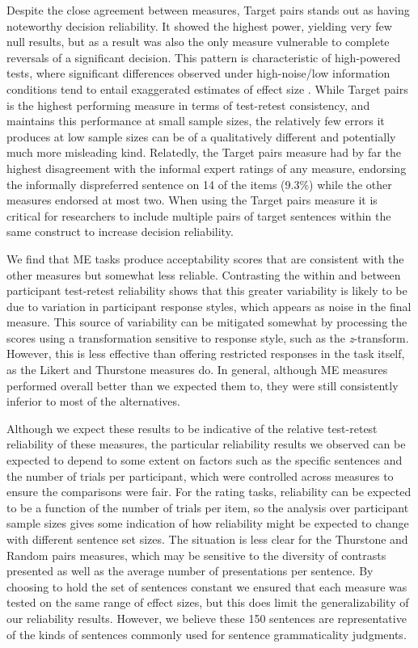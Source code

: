 \documentclass[doc]{apa6}
\newcommand{\targchoice}{{\sc Target pairs}}
\newcommand{\rndchoice}{{\sc Random pairs}}
\newcommand{\ME}{{\sc ME}}%
\newcommand{\thurstone}{{\sc Thurstone}}
\newcommand{\likert}{{\sc Likert}}
\newcommand{\ratingtask}{rating task}
\begin{document}
Despite the close agreement between measures, \targchoice{} stands out as having noteworthy decision reliability. It showed the highest power, yielding very few null results, but as a result was also the only measure vulnerable to complete reversals of a significant decision. This pattern is characteristic of high-powered tests, where significant differences observed under high-noise/low information conditions tend to entail exaggerated estimates of effect size \citep{gelman2017doesntkillmakesstrongerfallacy}. While \targchoice{} is the highest performing measure in terms of test-retest consistency, and maintains this performance at small sample sizes, the relatively few errors it produces at low sample sizes can be of a qualitatively different and potentially much more misleading kind. Relatedly, the \targchoice{} measure had by far the highest disagreement with the informal expert ratings of any measure, endorsing the informally dispreferred sentence on 14 of the items (9.3\%) while the other measures endorsed at most two.
When using the \targchoice{} measure it is critical for researchers to include multiple pairs of target sentences within the same construct to increase decision reliability.

We find that \ME{} tasks produce acceptability scores that are consistent with the other measures but somewhat less reliable. Contrasting the within and between participant test-retest reliability shows that this greater variability is likely to be due to variation in participant response styles, which appears as noise in the final measure. This source of variability can be mitigated somewhat by processing the scores using a transformation sensitive to response style, such as the {\it z}-transform. However, this is less effective than offering restricted responses in the task itself, as the \likert{} and \thurstone{} measures do. In general, although \ME{} measures performed overall better than we expected them to, they were still consistently inferior to most of the alternatives.

Although we expect these results to be indicative of the relative test-retest reliability of these measures, the particular reliability results we observed can be expected to depend to some extent on factors such as the specific sentences and the number of trials per participant, which were controlled across measures to ensure the comparisons were fair. For the {\ratingtask}s, reliability can be expected to be a function of the number of trials per item, so the analysis over participant sample sizes gives some indication of how reliability might be expected to change with different sentence set sizes. The situation is less clear for the \thurstone{} and \rndchoice{} measures, which may be sensitive to the diversity of contrasts presented as well as the average number of presentations per sentence. By choosing to hold the set of sentences constant we ensured that each measure was tested on the same range of effect sizes, but this does limit the generalizability of our reliability results. However, we believe these 150 sentences are representative of the kinds of sentences commonly used for sentence grammaticality judgments.
\end{document}
